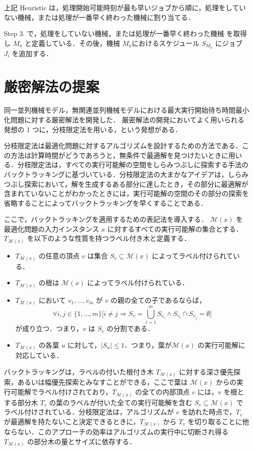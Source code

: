 \documentclass[12pt]{optlab-bachelor}
\begin{document}
上記 {\sc Heuristic} は，処理開始可能時刻が最も早いジョブから順に，処理をしていない機械，または処理が一番早く終わった機械に割り当てる．

Step 3. で，処理をしていない機械，または処理が一番早く終わった機械 を取得し $M_a$ と定義している．その後，機械 $M_a$におけるスケジュール $S_{M_a}$ にジョブ $J_i$ を追加する．

\section{厳密解法の提案}\label{5_s_2}
同一並列機械モデル，無関連並列機械モデルにおける最大実行開始待ち時間最小化問題に対する厳密解法を開発した．
厳密解法の開発においてよく用いられる発想の 1 つに，分枝限定法を用いる，という発想がある．

分枝限定法は最適化問題に対するアルゴリズムを設計するための方法である．この方法は計算時間がどうであろうと，無条件で最適解を見つけたいときに用いる．分枝限定法は，すべての実行可能解の空間をしらみつぶしに探索する手法のバックトラッキングに基づいている．分枝限定法の大まかなアイデアは，しらみつぶし探索において，解を生成するある部分に達したとき，その部分に最適解が含まれていないことがわかったときには，実行可能解の空間のその部分の探索を省略することによってバックトラッキングを早くすることである．

ここで，バックトラッキングを適用するための表記法を導入する．
$\mathcal{M}(x)$ を最適化問題の入力インスタンス $x$ に対するすべての実行可能解の集合とする．$T_{\mathcal{M}(x)}$ を以下のような性質を持つラベル付き木と定義する．
\begin{itemize}
  \item $T_{\mathcal{M}(x)}$ の任意の頂点 $v$ は集合 $S_v \subseteq \mathcal{M}(x)$ によってラベル付けられている．
  \item $T_{\mathcal{M}(x)}$ の根は $\mathcal{M}(x)$ によってラベル付けられている．
  \item $T_{\mathcal{M}(x)}$ において $v_1,\ldots,v_m$ が $v$ の親の全ての子であるならば，$$\forall i,j \in \{1,\ldots,m\}\bigg[i \neq j \Rightarrow S_v = \bigcup_{i = 1}^{m}S_{v_i} \land S_{v_i} \cap S_{v_j} = \emptyset \bigg]$$ が成り立つ．つまり，$v$ は $S_v$ の分割である．
  \item $T_{\mathcal{M}(x)}$ の各葉 $u$ に対して，$|S_u| \le 1$．つまり，葉が$\mathcal{M}(x)$ の実行可能解に対応している．
\end{itemize}

バックトラッキングは，ラベルの付いた根付き木 $T_{\mathcal{M}(x)}$ に対する深さ優先探索，あるいは幅優先探索とみなすことができる，ここで葉は $\mathcal{M}(x)$ からの実行可能解でラベル付けされており，$T_{\mathcal{M}(x)}$ の全ての内部頂点 $v$ には，$v$ を根とする部分木 $T_v$ の葉のラベルが付いた全ての実行可能解を含む $S_v \subseteq \mathcal{M}(x)$ でラベル付けされている．分枝限定法は，アルゴリズムが $v$ を訪れた時点で，$T_v$ が最適解を持たないこと決定できるときに，$T_{\mathcal{M}(x)}$ から $T_v$ を切り取ることに他ならない．このアプローチの効率はアルゴリズムの実行中に切断され得る $T_{\mathcal{M}(x)}$ の部分木の量とサイズに依存する．
\end{document}
